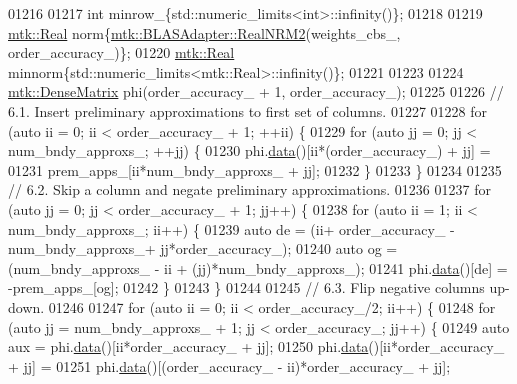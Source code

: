 \begin{DoxyCode}
{{01216 
01217     \textcolor{keywordtype}{int} minrow\_\{std::numeric\_limits<int>::infinity()\};
01218 
01219     \hyperlink{group__c01-roots_gac080bbbf5cbb5502c9f00405f894857d}{mtk::Real} norm\{\hyperlink{classmtk_1_1BLASAdapter_ab92440888b730863244c5d9479c11aca}{mtk::BLASAdapter::RealNRM2}(weights\_cbs\_,
      order\_accuracy\_)\};
01220     \hyperlink{group__c01-roots_gac080bbbf5cbb5502c9f00405f894857d}{mtk::Real} minnorm\{std::numeric\_limits<mtk::Real>::infinity()\};
01221 
01223 
01224     \hyperlink{classmtk_1_1DenseMatrix}{mtk::DenseMatrix} phi(order\_accuracy\_ + 1, order\_accuracy\_);
01225 
01226     \textcolor{comment}{// 6.1. Insert preliminary approximations to first set of columns.}
01227 
01228     \textcolor{keywordflow}{for} (\textcolor{keyword}{auto} ii = 0; ii < order\_accuracy\_ + 1; ++ii) \{
01229       \textcolor{keywordflow}{for} (\textcolor{keyword}{auto} jj = 0; jj < num\_bndy\_approxs\_; ++jj) \{
01230         phi.\hyperlink{classmtk_1_1DenseMatrix_a0c33b8a9e01d157c61ddbdf807c25d84}{data}()[ii*(order\_accuracy\_) + jj] =
01231           prem\_apps\_[ii*num\_bndy\_approxs\_ + jj];
01232       \}
01233     \}
01234 
01235     \textcolor{comment}{// 6.2. Skip a column and negate preliminary approximations.}
01236 
01237     \textcolor{keywordflow}{for} (\textcolor{keyword}{auto} jj = 0; jj < order\_accuracy\_ + 1; jj++) \{
01238       \textcolor{keywordflow}{for} (\textcolor{keyword}{auto} ii = 1; ii < num\_bndy\_approxs\_; ii++) \{
01239         \textcolor{keyword}{auto} de = (ii+ order\_accuracy\_ - num\_bndy\_approxs\_+ jj*order\_accuracy\_);
01240         \textcolor{keyword}{auto} og = (num\_bndy\_approxs\_ - ii + (jj)*num\_bndy\_approxs\_);
01241         phi.\hyperlink{classmtk_1_1DenseMatrix_a0c33b8a9e01d157c61ddbdf807c25d84}{data}()[de] = -prem\_apps\_[og];
01242       \}
01243     \}
01244 
01245     \textcolor{comment}{// 6.3. Flip negative columns up-down.}
01246 
01247     \textcolor{keywordflow}{for} (\textcolor{keyword}{auto} ii = 0; ii < order\_accuracy\_/2; ii++) \{
01248       \textcolor{keywordflow}{for} (\textcolor{keyword}{auto} jj = num\_bndy\_approxs\_ + 1; jj < order\_accuracy\_; jj++) \{
01249         \textcolor{keyword}{auto} aux = phi.\hyperlink{classmtk_1_1DenseMatrix_a0c33b8a9e01d157c61ddbdf807c25d84}{data}()[ii*order\_accuracy\_ + jj];
01250         phi.\hyperlink{classmtk_1_1DenseMatrix_a0c33b8a9e01d157c61ddbdf807c25d84}{data}()[ii*order\_accuracy\_ + jj] =
01251           phi.\hyperlink{classmtk_1_1DenseMatrix_a0c33b8a9e01d157c61ddbdf807c25d84}{data}()[(order\_accuracy\_ - ii)*order\_accuracy\_ + jj];
}}
\end{DoxyCode}
